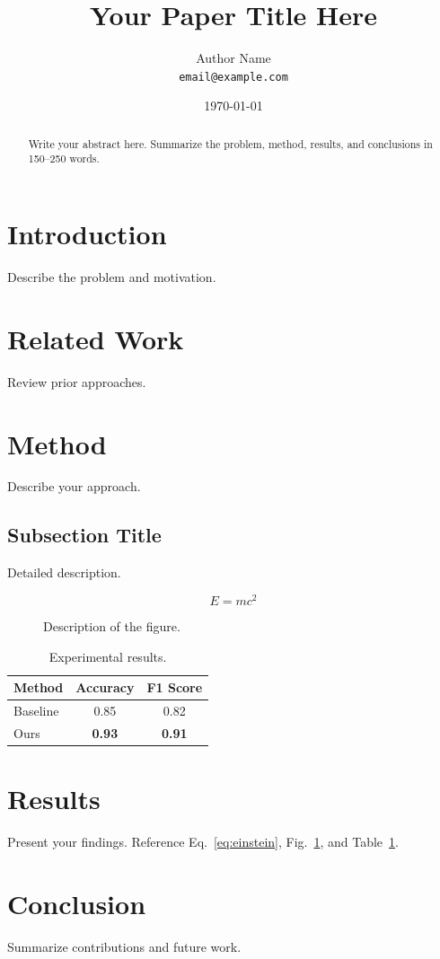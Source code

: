 \documentclass[12pt, a4paper]{article}
\title{Your Paper Title Here}
\author{Author Name \\ \texttt{email@example.com}}
\date{\today}
\begin{document}
\maketitle

\begin{abstract}
Write your abstract here. Summarize the problem, method, results, and conclusions in 150--250 words.
\end{abstract}

\section{Introduction}
Describe the problem and motivation.

\section{Related Work}
Review prior approaches.

\section{Method}
Describe your approach.

\subsection{Subsection Title}
Detailed description.

\begin{equation}
    E = mc^2
    \label{eq:einstein}
\end{equation}

\begin{figure}[htbp]
    \centering
    \caption{Description of the figure.}
    \label{fig:example}
\end{figure}

\begin{table}[htbp]
    \centering
    \caption{Experimental results.}
    \label{tab:results}
    \begin{tabular}{lcc}
        \toprule
        Method & Accuracy & F1 Score \\
        \midrule
        Baseline & 0.85 & 0.82 \\
        Ours & \textbf{0.93} & \textbf{0.91} \\
        \bottomrule
    \end{tabular}
\end{table}

\section{Results}
Present your findings. Reference Eq.~\eqref{eq:einstein}, Fig.~\ref{fig:example}, and Table~\ref{tab:results}.

\section{Conclusion}
Summarize contributions and future work.



\end{document}
